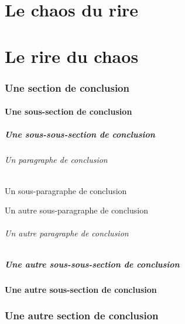 \documentclass{yathesis}
\begin{document}
\part{Le chaos du rire}



%
\part{Le rire du chaos}



%
\begin{conclusion*}
\section{Une section de conclusion}
\lipsum[26-27]
\subsection{Une sous-section de conclusion}
\lipsum[28-29]
\subsubsection{Une sous-sous-section de conclusion}
\lipsum[29-31]
\paragraph{Un paragraphe de conclusion}
\lipsum[31-35]
\subparagraph{Un sous-paragraphe de conclusion}
\lipsum[36-38]
\subparagraph{Un autre sous-paragraphe de conclusion}
\lipsum[39-41]
\paragraph{Un autre paragraphe de conclusion}
\lipsum[36-38]
\subsubsection{Une autre sous-sous-section de conclusion}
\lipsum[31-37]
\subsection{Une autre sous-section de conclusion}
\lipsum[29-31]
\section{Une autre section de conclusion}
\lipsum[28-43]
\end{conclusion*}
\end{document}
